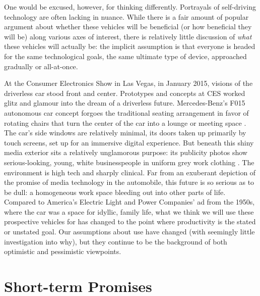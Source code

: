 One would be excused, however, for thinking differently.
Portrayals of self-driving technology are often lacking in nuance. While
there is a fair amount of popular argument about whether these
vehicles will be beneficial (or how beneficial they will be) along
various axes of interest, there is relatively little discussion of
\emph{what} these vehicles will actually be: the implicit
assumption is that everyone is headed for the same technological
goals, the same ultimate type of device, approached gradually or all-at-once.


At the Consumer Electronics Show in Las Vegas, in January
2015, visions of the driverless car stood front and center. Prototypes
and concepts at CES worked glitz and glamour into the dream of a
driverless future. Mercedes-Benz's F015 autonomous car
concept forgoes the traditional seating arrangement in favor of
rotating chairs that turn the center of the car into a lounge or
meeting space \cite{riofrioMB}. The car's side windows are relatively minimal, its
doors taken up primarily by touch screens, set up for an immersive digital
experience. But beneath this shiny media exterior sits a relatively
unglamorous purpose:  its publicity photos show serious-looking, young, white
businesspeople in uniform grey work clothing \cite{simpsonDesign}. The environment is
high tech and sharply clinical. Far from an exuberant depiction of the
promise of media technology in the automobile, this future is so
serious as to be dull: a homogeneous work space bleeding out into
other parts of life. Compared to America's Electric Light and Power
Companies' ad from the 1950s, where the car was a space for idyllic,
family life, what we think we will use these prospective vehicles for
has changed to the point where productivity is the stated or unstated
goal. Our assumptions about use have changed (with seemingly little
investigation into why), but they continue to be the background of both
optimistic and pessimistic viewpoints.

\section{Short-term Promises}

